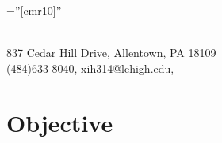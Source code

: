 \documentclass[letters,11pt]{article} %
\newcommand{\MYhref}[3][blue]{\href{#2}{\color{#1}{#3}}}%
\begin{document}
\pagestyle{empty} %

\font\fb=''[cmr10]'' %



\\
837 Cedar Hill Drive, Allentown, PA 18109\\(484)633-8040, {xih314@lehigh.edu}, \MYhref{www.xihey.com}{www.xihey.com}




\section{Objective}
\end{document}

